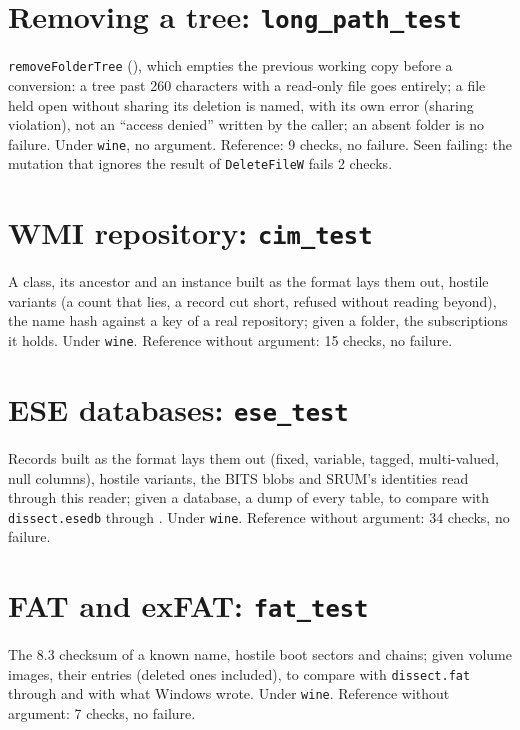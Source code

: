 \documentclass[11pt,a4paper,oneside]{report}
\begin{document}
\section{Removing a tree: \texttt{long\_path\_test}}

\texttt{removeFolderTree} (), which empties the previous
working copy before a conversion: a tree past 260 characters with a read-only
file goes entirely; a file held open without sharing its deletion is named,
with its own error (sharing violation), not an ``access denied'' written by the
caller; an absent folder is no failure. Under \texttt{wine}, no argument.
Reference: 9 checks, no failure. Seen failing: the mutation that ignores the
result of \texttt{DeleteFileW} fails 2 checks.

\section{WMI repository: \texttt{cim\_test}}

A class, its ancestor and an instance built as the format lays them out, hostile
variants (a count that lies, a record cut short, refused without reading
beyond), the name hash against a key of a real repository; given a
 folder, the subscriptions it holds. Under \texttt{wine}.
Reference without argument: 15 checks, no failure.

\section{ESE databases: \texttt{ese\_test}}

Records built as the format lays them out (fixed, variable, tagged, multi-valued,
null columns), hostile variants, the BITS blobs and SRUM's identities read
through this reader; given a database, a dump of every table, to compare with
\texttt{dissect.esedb} through . Under
\texttt{wine}. Reference without argument: 34 checks, no failure.

\section{FAT and exFAT: \texttt{fat\_test}}

The 8.3 checksum of a known name, hostile boot sectors and chains; given volume
images, their entries (deleted ones included), to compare with
\texttt{dissect.fat} through  and with what
Windows wrote. Under \texttt{wine}. Reference without argument: 7 checks, no
failure.
\end{document}
